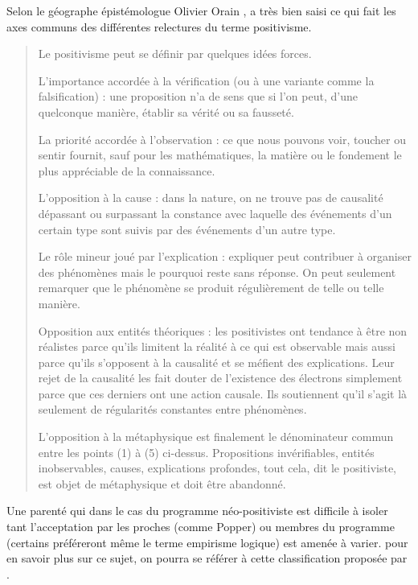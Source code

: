 Selon le géographe épistémologue Olivier Orain , \textcite{Hacking1989} a très bien saisi ce qui fait les axes communs des différentes relectures du terme positivisme. 

\blockquote[{\cite[82]{Hacking1989}}]{Le positivisme peut se définir par quelques idées forces. \begin{enumerate*}[label=(\arabic*)] \item L’importance accordée à la vérification (ou à une variante comme la falsification) : une proposition n’a de sens que si l’on peut, d’une quelconque manière, établir sa vérité ou sa fausseté. \item La priorité accordée à l’observation : ce que nous pouvons voir, toucher ou sentir fournit, sauf pour les mathématiques, la matière ou le fondement le plus appréciable de la connaissance. \item L’opposition à la cause : dans la nature, on ne trouve pas de causalité dépassant ou surpassant la constance avec laquelle des événements d’un certain type sont suivis par des événements d’un autre type. \item Le rôle mineur joué par l’explication : expliquer peut contribuer à organiser des phénomènes mais le pourquoi reste sans réponse. On peut seulement remarquer que le phénomène se produit régulièrement de telle ou telle manière. \item Opposition aux entités théoriques : les positivistes ont tendance à être non réalistes parce qu’ils limitent la réalité à ce qui est observable mais aussi parce qu’ils s’opposent à la causalité et se méfient des explications. Leur rejet de la causalité les fait douter de l’existence des électrons simplement parce que ces derniers ont une action causale. Ils soutiennent qu’il s’agit là seulement de régularités constantes entre phénomènes. \item L’opposition à la métaphysique est finalement le dénominateur commun entre les points (1) à (5) ci-dessus. Propositions invérifiables, entités inobservables, causes, explications profondes, tout cela, dit le positiviste, est objet de métaphysique et doit être abandonné.\end{enumerate*}}

Une parenté qui dans le cas du programme néo-positiviste est difficile à isoler tant l'acceptation par les proches (comme Popper) ou membres du programme (certains préféreront même le terme empirisme logique) est amenée à varier. pour en savoir plus sur ce sujet, on pourra se référer à cette classification proposée par \textcite[81-86]{Hacking1989}.

